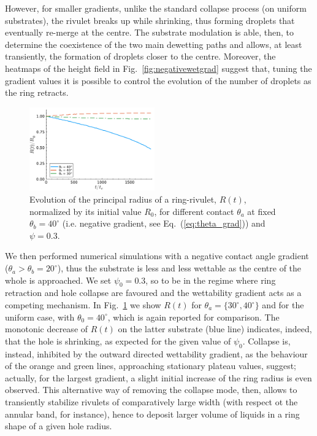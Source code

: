 \documentclass[twoside,twocolumn,9pt]{article}
\begin{document}
However, for smaller gradients, unlike the standard collapse process (on uniform substrates), the rivulet breaks up while shrinking, thus forming droplets that eventually re-merge at the centre. 
The substrate modulation is able, then, to determine the coexistence of the two main dewetting paths and allows, at least transiently, the formation of droplets closer to the centre. 
Moreover, the heatmaps of the height field in Fig.~\ref{fig:negativewetgrad} suggest that, tuning the gradient values it is possible to control the evolution of the number of droplets as the ring retracts.\\
\begin{figure}
    \centering
    \includegraphics[width=0.48\textwidth]{Figure_8.pdf}
    \caption{Evolution of the principal radius of a ring-rivulet, $R(t)$, normalized by its initial value $R_0$, for different contact $\theta_a$ at fixed $\theta_b = 40^{\circ}$ (i.e. negative gradient, see Eq.~(\ref{eq:theta_grad})) and $\psi = 0.3$.}
    \label{fig:positivewetgrad}
\end{figure}
We then performed numerical simulations with a negative contact angle gradient ($\theta_a > \theta_b = 20^{\circ}$), thus the substrate is less and less wettable as the centre of the whole is approached.
We set $\psi_0 = 0.3$, so to be in the regime where ring retraction and hole collapse are favoured and the wettability gradient acts as a competing mechanism.
In Fig.~\ref{fig:positivewetgrad} we show $R(t)$ for $\theta_a = \{ 30^{\circ}, 40^{\circ} \}$ and for the uniform case, with $\theta_0 = 40^{\circ}$, which is again reported for comparison.
The monotonic decrease of $R(t)$ on the latter substrate (blue line) indicates, indeed, that the hole is shrinking, as expected for the given value of $\psi_0$. 
Collapse is, instead, inhibited by the outward directed wettability gradient, as the behaviour of the orange and green lines, approaching stationary plateau values, suggest; actually, for the largest gradient, a slight initial increase of the ring radius is even observed. 
This alternative way of removing the collapse mode, then, allows to transiently stabilize rivulets of comparatively large width (with respect ot the annular band, for instance), hence to deposit larger volume of liquids in a ring shape of a given hole radius. 
\end{document}
